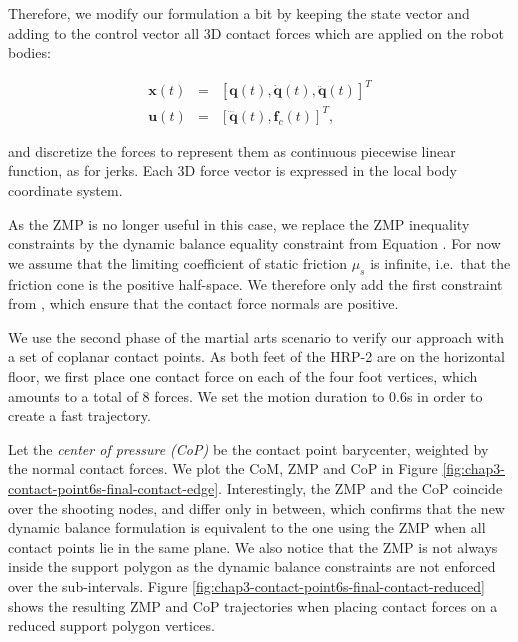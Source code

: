 Therefore, we modify our formulation a bit by keeping the state vector
and adding to the control vector all 3D contact forces which are
applied on the robot bodies:

\begin{equation}
  \begin{array}{rcl}
  \mathbf{x}(t) & = & [\mathbf{q}(t), \mathbf{\dot{q}}(t), \mathbf{\ddot{q}}(t)]^T \\
  \mathbf{u}(t) & = & [\mathbf{\dddot{q}}(t), \mathbf{f}_c(t)]^T,
  \end{array}
  \label{variables-contact-point}
\end{equation}

\noindent and discretize the forces to represent them as continuous piecewise
linear function, as for jerks. Each 3D force vector is expressed in
the local body coordinate system.

As the ZMP is no longer useful in this case, we replace the ZMP
inequality constraints by the dynamic balance equality constraint from
Equation . For now we assume
that the limiting coefficient of static friction $\mu_s$ is infinite,
i.e.\ that the friction cone is the positive half-space. We therefore
only add the first constraint from , which
ensure that the contact force normals are positive.

We use the second phase of the martial arts scenario to verify our
approach with a set of coplanar contact points. As both feet of the
HRP-2 are on the horizontal floor, we first place one contact force on
each of the four foot vertices, which amounts to a total of 8
forces. We set the motion duration to $0.6$s in order to create a fast
trajectory.

Let the \emph{center of pressure (CoP)} be the contact point
barycenter, weighted by the normal contact forces. We plot the CoM,
ZMP and CoP in Figure
\ref{fig:chap3-contact-point6s-final-contact-edge}. Interestingly, the
ZMP and the CoP coincide over the shooting nodes, and differ only in
between, which confirms that the new dynamic balance formulation is
equivalent to the one using the ZMP when all contact points lie in the
same plane. We also notice that the ZMP is not always inside the support
polygon as the dynamic balance constraints are not enforced over the
sub-intervals. Figure
\ref{fig:chap3-contact-point6s-final-contact-reduced} shows the
resulting ZMP and CoP trajectories when placing contact forces on a
reduced support polygon vertices.

